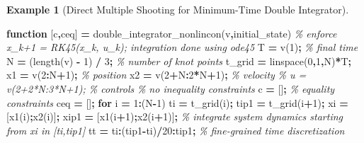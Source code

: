 \documentclass[
]{book}
\newenvironment{Shaded}{\begin{snugshade}}{\end{snugshade}}
\newcommand{\CommentTok}[1]{\textcolor[rgb]{0.56,0.35,0.01}{\textit{#1}}}
\newcommand{\FloatTok}[1]{\textcolor[rgb]{0.00,0.00,0.81}{#1}}
\newcommand{\KeywordTok}[1]{\textcolor[rgb]{0.13,0.29,0.53}{\textbf{#1}}}
\newcommand{\NormalTok}[1]{#1}
\newcommand{\OperatorTok}[1]{\textcolor[rgb]{0.81,0.36,0.00}{\textbf{#1}}}
\newcommand{\VariableTok}[1]{\textcolor[rgb]{0.00,0.00,0.00}{#1}}
\theoremstyle{definition}
\theoremstyle{definition}
\newtheorem{example}{Example}[chapter]
\theoremstyle{definition}
\theoremstyle{definition}
\theoremstyle{remark}
\begin{document}
\begin{example}[Direct Multiple Shooting for Minimum-Time Double Integrator]
\begin{Shaded}
\begin{Highlighting}[]
\KeywordTok{function}\NormalTok{ [}\VariableTok{c}\OperatorTok{,}\VariableTok{ceq}\NormalTok{] }\OperatorTok{=} \VariableTok{double\_integrator\_nonlincon}\NormalTok{(}\VariableTok{v}\OperatorTok{,}\VariableTok{initial\_state}\NormalTok{)}
\CommentTok{\% enforce x\_k+1 = RK45(x\_k, u\_k); integration done using ode45}
\VariableTok{T} \OperatorTok{=} \VariableTok{v}\NormalTok{(}\FloatTok{1}\NormalTok{)}\OperatorTok{;} \CommentTok{\% final time}
\VariableTok{N} \OperatorTok{=}\NormalTok{ (}\VariableTok{length}\NormalTok{(}\VariableTok{v}\NormalTok{) }\OperatorTok{{-}} \FloatTok{1}\NormalTok{) }\OperatorTok{/} \FloatTok{3}\OperatorTok{;} \CommentTok{\% number of knot points}
\VariableTok{t\_grid} \OperatorTok{=} \VariableTok{linspace}\NormalTok{(}\FloatTok{0}\OperatorTok{,}\FloatTok{1}\OperatorTok{,}\VariableTok{N}\NormalTok{)}\OperatorTok{*}\VariableTok{T}\OperatorTok{;}
\VariableTok{x1} \OperatorTok{=} \VariableTok{v}\NormalTok{(}\FloatTok{2}\OperatorTok{:}\VariableTok{N}\OperatorTok{+}\FloatTok{1}\NormalTok{)}\OperatorTok{;} \CommentTok{\% position }
\VariableTok{x2} \OperatorTok{=} \VariableTok{v}\NormalTok{(}\FloatTok{2}\OperatorTok{+}\VariableTok{N}\OperatorTok{:}\FloatTok{2}\OperatorTok{*}\VariableTok{N}\OperatorTok{+}\FloatTok{1}\NormalTok{)}\OperatorTok{;} \CommentTok{\% velocity}
\CommentTok{\% u = v(2+2*N:3*N+1); \% controls}
\CommentTok{\% no inequality constraints}
\VariableTok{c} \OperatorTok{=}\NormalTok{ []}\OperatorTok{;} 
\CommentTok{\% equality constraints}
\VariableTok{ceq} \OperatorTok{=}\NormalTok{ []}\OperatorTok{;}
\KeywordTok{for} \VariableTok{i} \OperatorTok{=} \FloatTok{1}\OperatorTok{:}\NormalTok{(}\VariableTok{N}\OperatorTok{{-}}\FloatTok{1}\NormalTok{)}
    \VariableTok{ti} \OperatorTok{=} \VariableTok{t\_grid}\NormalTok{(}\VariableTok{i}\NormalTok{)}\OperatorTok{;}
    \VariableTok{tip1} \OperatorTok{=} \VariableTok{t\_grid}\NormalTok{(}\VariableTok{i}\OperatorTok{+}\FloatTok{1}\NormalTok{)}\OperatorTok{;}
    \VariableTok{xi} \OperatorTok{=}\NormalTok{ [}\VariableTok{x1}\NormalTok{(}\VariableTok{i}\NormalTok{)}\OperatorTok{;}\VariableTok{x2}\NormalTok{(}\VariableTok{i}\NormalTok{)]}\OperatorTok{;}
    \VariableTok{xip1} \OperatorTok{=}\NormalTok{ [}\VariableTok{x1}\NormalTok{(}\VariableTok{i}\OperatorTok{+}\FloatTok{1}\NormalTok{)}\OperatorTok{;}\VariableTok{x2}\NormalTok{(}\VariableTok{i}\OperatorTok{+}\FloatTok{1}\NormalTok{)]}\OperatorTok{;}
    \CommentTok{\% integrate system dynamics starting from xi in [ti,tip1]}
    \VariableTok{tt} \OperatorTok{=} \VariableTok{ti}\OperatorTok{:}\NormalTok{(}\VariableTok{tip1}\OperatorTok{{-}}\VariableTok{ti}\NormalTok{)}\OperatorTok{/}\FloatTok{20}\OperatorTok{:}\VariableTok{tip1}\OperatorTok{;} \CommentTok{\% fine{-}grained time discretization}

\end{Highlighting}
\end{Shaded}
\end{example}
\end{document}
